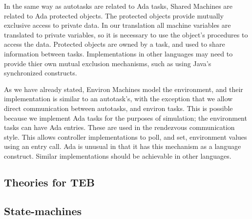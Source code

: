 In the same way as autotasks are related to Ada tasks, Shared Machines are related to Ada protected objects. The protected objects provide mutually exclusive access to private data. In our translation all machine variables are translated to private variables, so it is necessary to use the object's procedures to access the data. Protected objects are owned by a task, and used to share information between tasks. Implementations in other languages may need to provide thier own mutual exclusion mechanisms, such as using Java's synchronized constructs. 

As we have already stated, Environ Machines model the environment, and their implementation is similar to an autotask's, with the exception that we allow direct communication between autotasks, and environ tasks. This is possible because we implement Ada tasks for the purposes of simulation; the environment tasks can have Ada entries. These are used in the rendezvous communication style. This allows controller implementations to poll, and set, environment values using an entry call. Ada is unusual in that it has this mechanism as a language construct. Similar implementations should be achievable in other languages.

\subsection{Theories for TEB}

\subsection{State-machines}